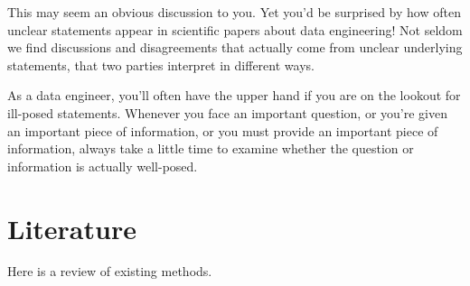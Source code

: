 \documentclass[]{book}
\begin{document}
This may seem an obvious discussion to you. Yet you'd be surprised by how often unclear statements appear in scientific papers about data engineering! Not seldom we find discussions and disagreements that actually come from unclear underlying statements, that two parties interpret in different ways.

As a data engineer, you'll often have the upper hand if you are on the lookout for ill-posed statements. Whenever you face an important question, or you're given an important piece of information, or you must provide an important piece of information, always take a little time to examine whether the question or information is actually well-posed.

\hypertarget{literature}{%
\chapter{Literature}\label{literature}}

Here is a review of existing methods.


\end{document}

